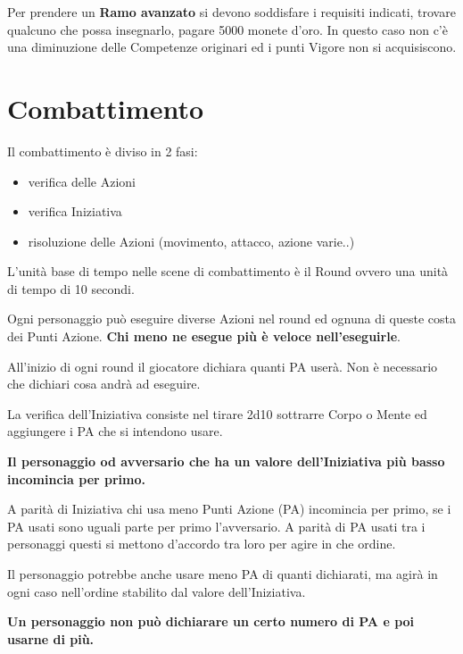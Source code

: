 \documentclass[12pt,a4paper,twoside,openany]{book}
\begin{document}
\begin{multicols}{2}
Per prendere un \textbf{Ramo avanzato} si devono soddisfare i requisiti indicati, trovare qualcuno che possa insegnarlo, pagare 5000 monete d'oro. In questo caso non c'è una diminuzione delle Competenze originari ed i punti Vigore non si acquisiscono.


\end{multicols}

\pagebreak

\section{Combattimento}\label{Combattimento}\hypertarget{Combattimento}{}

\begin{multicols}{2}
	
Il combattimento è diviso in 2 fasi:
\begin{itemize}
	\item verifica delle Azioni
	\item verifica Iniziativa
	\item risoluzione delle Azioni (movimento, attacco, azione varie..)
\end{itemize}

L'unità base di tempo nelle scene di combattimento è il Round ovvero una unità di tempo di 10 secondi.

Ogni personaggio può eseguire diverse Azioni nel round ed ognuna di queste costa dei Punti Azione. \textbf{Chi meno ne esegue più è veloce nell'eseguirle}.

All'inizio di ogni round il giocatore dichiara quanti PA userà. Non è necessario che dichiari cosa andrà ad eseguire.

La verifica dell'Iniziativa consiste nel tirare 2d10 sottrarre Corpo o Mente ed aggiungere i PA che si intendono usare.

\textbf{Il personaggio od avversario che ha un valore dell'Iniziativa più basso incomincia per primo.}

A parità di Iniziativa chi usa meno Punti Azione (PA) incomincia per primo, se i PA usati sono uguali parte per primo l'avversario.
A parità di PA usati tra i personaggi questi si mettono d'accordo tra loro per agire in che ordine.

Il personaggio potrebbe anche usare meno PA di quanti dichiarati, ma agirà in ogni caso nell'ordine stabilito dal valore dell'Iniziativa.

\textbf{Un personaggio non può dichiarare un certo numero di PA e poi usarne di più.}


\end{multicols}
\end{document}
